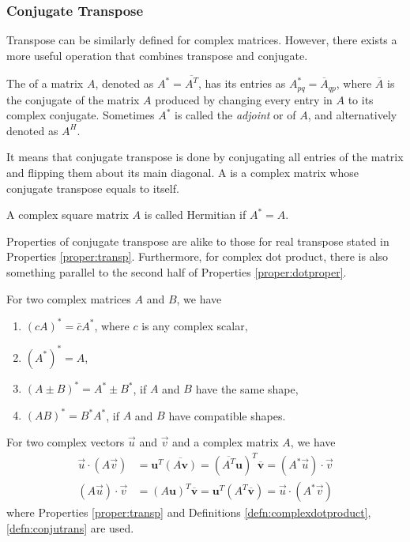 \subsubsection{Conjugate Transpose}
Transpose can be similarly defined for complex matrices. However, there exists a more useful operation that combines transpose and conjugate.
\begin{defn}
\label{defn:conjutrans}
The  of a matrix $A$, denoted as $A^* = \overline{A^T}$, has its entries as $A^*_{pq} = \overline{A}_{qp}$, where $\overline{A}$ is the conjugate of the matrix $A$ produced by changing every entry in $A$ to its complex conjugate. Sometimes $A^*$ is called the \textit{adjoint} or  of $A$, and alternatively denoted as $A^H$. 
\end{defn}
It means that conjugate transpose is done by conjugating all entries of the matrix and flipping them about its main diagonal. A  is a complex matrix whose conjugate transpose equals to itself.
\begin{defn}
\label{defn:Hermitian}
A complex square matrix $A$ is called Hermitian if $A^* = A$.
\end{defn}
Properties of conjugate transpose are alike to those for real transpose stated in Properties \ref{proper:transp}. Furthermore, for complex dot product, there is also something parallel to the second half of Properties \ref{proper:dotproper}.
\begin{proper}
\label{proper:complexmat}
For two complex matrices $A$ and $B$, we have
\begin{enumerate}
\item $(cA)^* = \overline{c}A^*$, where $c$ is any complex scalar,
\item $(A^*)^* = A$,
\item $(A \pm B)^* = A^* \pm B^*$, if $A$ and $B$ have the same shape,
\item $(AB)^* = B^*A^*$, if $A$ and $B$ have compatible shapes.
\end{enumerate}
\end{proper}
\begin{proper}
\label{proper:complexdotherm}
For two complex vectors $\vec{u}$ and $\vec{v}$ and a complex matrix $A$, we have 
\begin{align*}
\vec{u} \cdot (A\vec{v}) &= \textbf{u}^T\overline{(A\textbf{v})} = (\overline{A^T}\textbf{u})^T\overline{\textbf{v}} = (A^*\vec{u}) \cdot \vec{v} \\
(A\vec{u}) \cdot \vec{v} &= (A\textbf{u})^T\overline{\textbf{v}} = \textbf{u}^T(A^T\overline{\textbf{v}}) = \vec{u} \cdot (A^*\vec{v})
\end{align*}
where Properties \ref{proper:transp} and Definitions \ref{defn:complexdotproduct}, \ref{defn:conjutrans} are used.
\end{proper}

